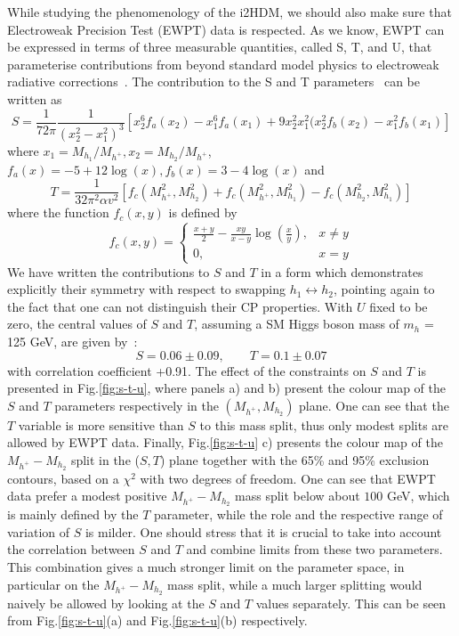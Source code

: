 \documentclass[12pt,a4paper]{article}
\begin{document}
While studying the phenomenology of the i2HDM, we should also make sure that 
Electroweak Precision Test (EWPT) data is respected.
As we know, EWPT can be  expressed in terms of three measurable quantities, called S, T, and U, that parameterise contributions
from beyond standard model physics  to electroweak radiative corrections~\cite{PhysRevD.46.381}.
The contribution to the S and T parameters~\cite{Barbieri:2006dq} can be written as
\begin{equation}
S = 
\frac{1}{72\pi}\frac{1}{(x_2^2-x_1^2)^3}
\left[ 
x_2^6 f_a(x_2) -x_1^6 f_a(x_1)
+ 9 x_2^2 x_1^2( x_2^2 f_b(x_2) - x_1^2 f_b(x_1)
\right]
\end{equation}
where $x_1=M_{h_1}/M_{h^+}, x_2=M_{h_2}/M_{h^+}$, $f_a(x) = -5+12\log(x), f_b(x)=3-4\log(x)$
and
%
\begin{equation}
T = \frac{1}{32\pi^2\alpha v^2}\left[f_c(M_{h^{+}}^2,M_{h_2}^2) + f_c(M_{h^{+}}^2,M_{h_1}^2) - f_c(M_{h_2}^2,M_{h_1}^2)\right]
\end{equation}
where the function $f_c(x,y)$ is defined by
\begin{equation*}
f_c(x,y) = 
\begin{cases}
\frac{x+y}{2}-\frac{xy}{x-y}\log{\left(\frac{x}{y}\right)}, & x\neq y\\
0, & x = y
\end{cases}
\end{equation*}
We have written the contributions to $S$ and $T$ in a form which demonstrates explicitly their symmetry
with respect to swapping $h_1 \leftrightarrow h_2$, pointing again to the fact that one can not distinguish their CP properties.
With $U$ fixed to be zero, the central values of $S$ and $T$, assuming a SM Higgs boson mass of $m_h$ = 125 GeV, are given by~\cite{Baak:2014ora}:
\begin{equation}
S = 0.06 \pm 0.09 ,\qquad T = 0.1 \pm 0.07
\label{eq:ewpt}
\end{equation}
with correlation coefficient +0.91.
The effect of the constraints on $S$ and $T$ is presented in  Fig.\ref{fig:s-t-u}, where panels a) and b)  present the 
colour map of the $S$ and  $T$ parameters respectively 
in the $(M_{h^+},M_{h_2})$ plane.
One can see that the $T$ variable is more  sensitive than $S$
to this mass split, thus only modest splits
are allowed by EWPT data.
Finally, Fig.\ref{fig:s-t-u} c) presents  the colour map
of the $M_{h^+}-M_{h_2}$  split in the ($S,T$) plane together with the
65\% and 95\% exclusion contours, based on a $\chi^2$ with  two degrees of freedom.
  One can see that
EWPT data prefer a modest positive $M_{h^+}-M_{h_2}$ mass split 
 below  about $100$ GeV, which is mainly defined by the $T$ parameter, while the role and the respective range of variation of $S$ is milder. One should stress that 
 it is crucial to take into account the correlation between
$S$ and $T$ and  combine limits from these two  parameters. This combination gives a much stronger limit on the parameter 
space, in particular on the $M_{h^+}-M_{h_2}$ mass split, while a much larger splitting would
naively be allowed by looking at the $S$ and $T$ values separately. This can be
seen from  Fig.\ref{fig:s-t-u}(a) and Fig.\ref{fig:s-t-u}(b) respectively.
  
\end{document}
